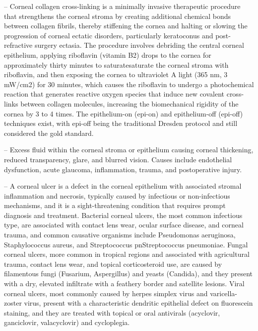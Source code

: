 -- Corneal collagen cross-linking is a minimally invasive therapeutic procedure that strengthens the corneal stroma by creating additional chemical bonds between collagen fibrils, thereby stiffening the cornea and halting or slowing the progression of corneal ectatic disorders, particularly keratoconus and post-refractive surgery ectasia. The procedure involves debriding the central corneal epithelium, applying riboflavin (vitamin B2) drops to the cornea for approximately thirty minutes to saturatesaturate the corneal stroma with riboflavin, and then exposing the cornea to ultraviolet A light (365 nm, 3 mW/cm2) for 30 minutes, which causes the riboflavin to undergo a photochemical reaction that generates reactive oxygen species that induce new covalent cross-links between collagen molecules, increasing the biomechanical rigidity of the cornea by 3 to 4 times. The epithelium-on (epi-on) and epithelium-off (epi-off) techniques exist, with epi-off being the traditional Dresden protocol and still considered the gold standard.

-- Excess fluid within the corneal stroma or epithelium causing corneal thickening, reduced transparency, glare, and blurred vision. Causes include endothelial dysfunction, acute glaucoma, inflammation, trauma, and postoperative injury.

-- A corneal ulcer is a defect in the corneal epithelium with associated stromal inflammation and necrosis, typically caused by infectious or non-infectious mechanisms, and it is a sight-threatening condition that requires prompt diagnosis and treatment. Bacterial corneal ulcers, the most common infectious type, are associated with contact lens wear, ocular surface disease, and corneal trauma, and common causative organisms include Pseudomonas aeruginosa, Staphylococcus aureus, and Streptococcus pnStreptococcus pneumoniae. Fungal corneal ulcers, more common in tropical regions and associated with agricultural trauma, contact lens wear, and topical corticosteroid use, are caused by filamentous fungi (Fusarium, Aspergillus) and yeasts (Candida), and they present with a dry, elevated infiltrate with a feathery border and satellite lesions. Viral corneal ulcers, most commonly caused by herpes simplex virus and varicella-zoster virus, present with a characteristic dendritic epithelial defect on fluorescein staining, and they are treated with topical or oral antivirals (acyclovir, ganciclovir, valacyclovir) and cycloplegia.

